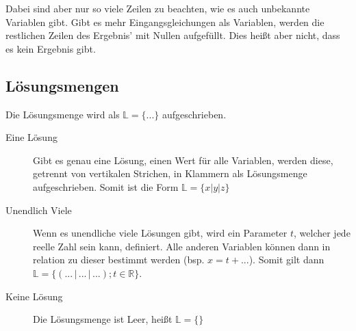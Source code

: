\documentclass{article}
\begin{document}
\noindent Dabei sind aber nur so viele Zeilen zu beachten, wie es auch unbekannte Variablen gibt. Gibt es mehr Eingangsgleichungen als Variablen, werden die restlichen Zeilen des Ergebnis' mit Nullen aufgefüllt. Dies heißt aber nicht, dass es kein Ergebnis gibt.
 
\subsection{Lösungsmengen}
Die Lösungsmenge wird als $\mathbb{L} = \{...\}$ aufgeschrieben.
 
\begin{description}
 \item[Eine Lösung] Gibt es genau eine Lösung, einen Wert für alle Variablen, werden diese, getrennt von vertikalen Strichen, in Klammern als Lösungsmenge aufgeschrieben. Somit ist die Form $\mathbb{L} = \{x \vert y \vert z\}$
  
 \item[Unendlich Viele] Wenn es unendliche viele Lösungen gibt, wird ein Parameter $t$, welcher jede reelle Zahl sein kann, definiert. Alle anderen Variablen können dann in relation zu dieser bestimmt werden (bsp. $x = t + ...$).
Somit gilt dann $\mathbb{L} = \{(... \,\vert\, ... \,\vert\, ...); t \in \mathbb{R}\}$.
 
 \item[Keine Lösung] Die Lösungsmenge ist Leer, heißt $\mathbb{L} = \{\}$
\end{description}
\end{document}
